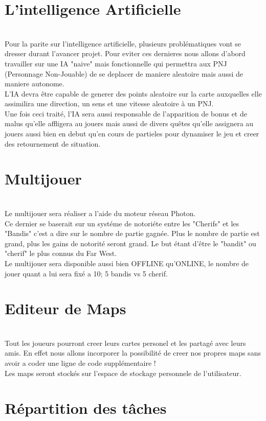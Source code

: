 \documentclass[12pt]{report}
\begin{document}
    \section{L'intelligence Artificielle}
\\ Pour la parite sur l'intelligence artificielle, plusieurs problématiques vont se dresser durant l'avancer projet. \newline
Pour eviter ces dernieres nous allons d'abord travailler sur une IA "naive" mais fonctionnelle qui permettra aux PNJ (Personnage Non-Jouable) de se deplacer de maniere aleatoire mais aussi de maniere autonome.\\ L'IA devra être capable de generer des points aleatoire sur la carte auxquelles elle assimilira une direction, un sens et une vitesse aleatoire à un PNJ.\\ Une fois ceci traité, l'IA sera aussi responsable de l'apparition de bonus et de malus qu'elle affligera au jouers mais aussi de divers quêtes qu'elle assignera au jouers aussi bien en debut qu'en cours de partieles pour dynamiser le jeu et creer des retournement de situation.
    \section{Multijouer}
\\ Le multijouer sera réaliser a l'aide du moteur réseau Photon. \\
Ce dernier se baserait sur un systéme de notoriéte entre les "Cherifs" 
et les "Bandis" c'est a dire sur le nombre de partie gagnée. Plus le nombre de partie est grand, plus les gains de notorité seront grand. Le but étant d'être le "bandit" ou "cherif" le plus connus du Far West. 
\\ Le multijouer sera disponible aussi bien OFFLINE qu'ONLINE, le nombre de jouer quant a lui sera fixé a 10; 5 bandis vs 5 cherif.
    \section{Editeur de Maps}
\\ 
Tout les joueurs pourront creer leurs cartes personel et les partagé avec leurs amis. En effet nous allons incorporer la possibilité de creer nos propres maps sans avoir a coder une ligne de code supplémentaire !\\ Les maps seront stockés sur l'espace de stockage personnele de l'utilisateur.
    \section{Répartition des tâches} 
\end{document}
